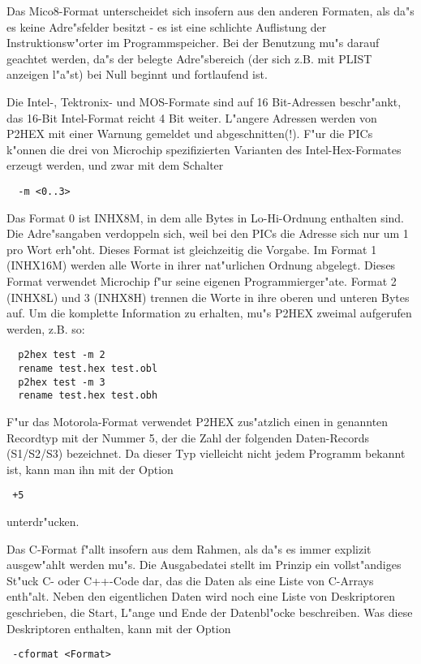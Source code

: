 \documentclass[12pt,a4paper,twoside]{report}
\begin{document}
Das Mico8-Format unterscheidet sich insofern aus den anderen
Formaten, als da"s es keine Adre"sfelder besitzt - es ist eine
schlichte Auflistung der Instruktionsw"orter im Programmspeicher.
Bei der Benutzung mu"s darauf geachtet werden, da"s der
belegte Adre"sbereich (der sich z.B. mit PLIST anzeigen l"a"st)
bei Null beginnt und fortlaufend ist.

Die Intel-, Tektronix- und MOS-Formate sind auf 16 Bit-Adressen
beschr"ankt, das 16-Bit Intel-Format reicht 4 Bit weiter.  L"angere
Adressen werden von P2HEX mit einer Warnung gemeldet und abgeschnitten(!).
F"ur die PICs k"onnen die drei von Microchip spezifizierten Varianten des
Intel-Hex-Formates erzeugt werden, und zwar mit dem Schalter
\begin{verbatim}
  -m <0..3>
\end{verbatim}
Das Format 0 ist INHX8M, in dem alle Bytes in Lo-Hi-Ordnung enthalten
sind.  Die Adre"sangaben verdoppeln sich, weil bei den PICs die Adresse
sich nur um 1 pro Wort erh"oht.  Dieses Format ist gleichzeitig die Vorgabe.
Im Format 1 (INHX16M) werden alle Worte in ihrer nat"urlichen Ordnung
abgelegt.  Dieses Format verwendet Microchip f"ur seine eigenen
Programmierger"ate.  Format 2 (INHX8L) und 3 (INHX8H) trennen die Worte
in ihre oberen und unteren Bytes auf.  Um die komplette Information zu
erhalten, mu"s P2HEX zweimal aufgerufen werden, z.B. so:
\begin{verbatim}
  p2hex test -m 2
  rename test.hex test.obl
  p2hex test -m 3
  rename test.hex test.obh
\end{verbatim}
F"ur das Motorola-Format verwendet P2HEX zus"atzlich einen in \cite{CPM68K}
genannten Recordtyp mit der Nummer 5, der die Zahl der folgenden
Daten-Records (S1/S2/S3) bezeichnet.  Da dieser Typ vielleicht nicht jedem
Programm bekannt ist, kann man ihn mit der Option
\begin{verbatim}
 +5
\end{verbatim}
unterdr"ucken.
\par
Das C-Format f"allt insofern aus dem Rahmen, als da"s es immer explizit 
ausgew"ahlt werden mu"s.  Die Ausgabedatei stellt im Prinzip ein vollst"andiges
St"uck C- oder C++-Code dar, das die Daten als eine Liste von C-Arrays
enth"alt.  Neben den eigentlichen Daten wird noch eine Liste von Deskriptoren
geschrieben, die Start, L"ange und Ende der Datenbl"ocke 
beschreiben.  Was diese Deskriptoren enthalten, kann mit der Option
\begin{verbatim}
 -cformat <Format>
\end{verbatim}
\end{document}
